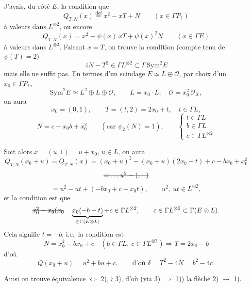 \documentclass[11pt,a4paper]{article}
\begin{document}

J'avais, du côté $E$, la condition que
\[
  Q_{T,N}(x) \overset{\mathrm{def}}{=} x^2 - xT + N \qquad (x \in \Gamma P_1)
\]
à valeurs dans $L^{\otimes 2}$, ou encore
\[
  Q_{T,N}(x) = x^2 - \psi(x)\,xT + \psi(x)^2 N \qquad (x \in \Gamma E)
\]
à valeurs dans $L^{\otimes 2}$. Faisant $x = T$, on trouve la condition
 (compte tenu de $\psi(T) = 2$)
\[
  4N - T^2 \in \Gamma L^{\otimes 2} \subset \Gamma\,\mathrm{Sym}^2 E
\]
mais elle ne suffit pas. En termes d'un scindage $E \simeq L \oplus \mathcal{O}$,
par choix d'un $x_0 \in \Gamma P_1$,
\[
  \mathrm{Sym}^2 E \simeq L^2 \oplus L \oplus \mathcal{O},
  \qquad
  L = x_0 \cdot L, \quad \mathcal{O} = x_0^2\,\mathcal{O}_X,
\]
on aura
\[
  x_0 = (0,1), \qquad T = (t,2) = 2x_0 + t, \quad t \in \Gamma L,
\]
\[
  N = c - x_0 b + x_0^2 \qquad (\text{car } \psi_2(N) = 1),
  \qquad
  \left\{\begin{array}{l} t \in \Gamma L \\ b \in \Gamma L \\ c \in \Gamma L^{\otimes 2} \end{array}\right.
\]

Soit alors $x = (u,1) = u + x_0$, $u \in L$, on aura
\[
  Q_{T,N}(x_0+u) = Q_{T,N}(x) = (x_0+u)^2 - (x_0+u)(2x_0+t) + c - bx_0 + x_0^2
\]
\[
  \text{\struck{$= \ldots u^2 - (\ldots)$}}
\]
\[
  = u^2 - ut + (-bx_0 + c - x_0 t),
  \qquad u^2,\ ut \in L^{\otimes 2},
\]
et la condition est que
\[
  \text{\struck{$x_0^2 - x_0(x_0$}}\quad
  \underbrace{x_0(-b - t)}_{\in\, \Gamma(E \otimes L)} + c \in \Gamma L^{\otimes 2},
  \qquad c \in \Gamma L^{\otimes 2} \subset \Gamma(E \otimes L).
\]
Cela signifie $\boxed{t = -b}$, i.e.\ la condition est \struck{\ill{}}
\[
  \boxed{N = x_0^2 - bx_0 + c
  \quad (b \in \Gamma L,\ c \in \Gamma L^{\otimes 2})
  \Longrightarrow T = 2x_0 - b}
\]
d'où
\[
  \boxed{Q(x_0+u) = u^2 + bu + c},
  \qquad
  \text{d'où } \delta = T^2 - 4N = b^2 - 4c .
\]


Ainsi on trouve équivalence  $\Leftrightarrow$ 2), $\wr$ 3), d'où (via 3) $\Rightarrow$ 1)) la flèche 2) $\to$ 1).
\end{document}
